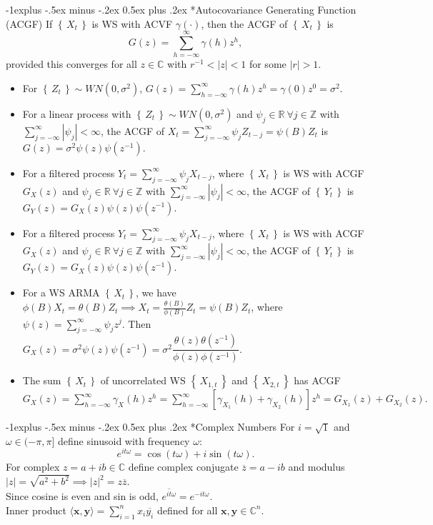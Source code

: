 \documentclass[paper=a4,fontsize=2.89mm]{scrartcl}
\makeatletter
\newcommand{\R}{\mathbb{R}}
\newcommand{\Z}{\mathbb{Z}}
\newcommand{\C}{\mathbb{C}}
\newcommand\abs[1]{\left| #1 \right|}
\newcommand\set[1]{\left\{\, #1 \,\right\}}
\renewcommand{\subsection}{\@startsection{subsection}{2}{0mm}%
                                {-1explus -.5ex minus -.2ex}%
                                {0.5ex plus .2ex}%
                                {\normalfont\normalsize\bfseries}}
\makeatother
\begin{document}
\begin{multicols}{3}
\subsection*{Autocovariance Generating Function (ACGF)}
If $\set{X_t}$ is WS with ACVF $\gamma(\cdot)$, then the ACGF of $\set{X_t}$ is
$$G(z) = \sum_{h=-\infty}^\infty \gamma(h)z^h,$$
provided this converges for all $z\in\C$ with $r^{-1}<\abs{z}<1$ for some $\abs{r}>1$. 
\begin{itemize}
\item
For $\set{Z_t} \sim WN(0,\sigma^2)$, $G(z) = \sum_{h=-\infty}^\infty\gamma(h)z^h = \gamma(0)z^0 = \sigma^2$.

\item
For a linear process with  $\set{Z_t} \sim WN(0,\sigma^2)$ and $\psi_j\in\R~\forall j\in\Z$ with $\sum_{j=-\infty}^\infty\abs{\psi_j}<\infty$,
the ACGF of  $X_t = \sum_{j=-\infty}^\infty \psi_jZ_{t-j} = \psi(B)Z_t$ is $G(z) = \sigma^2\psi(z)\psi(z^{-1}).$ 

\item
For a filtered process $Y_t = \sum_{j=-\infty}^\infty \psi_jX_{t-j}$, where $\set{X_t}$ is WS with ACGF $G_X(z)$ and $\psi_j\in\R~\forall j\in\Z$ with $\sum_{j=-\infty}^\infty\abs{\psi_j}<\infty$, the ACGF of $\set{Y_t}$ is $G_Y(z) = G_X(z)\psi(z)\psi(z^{-1}).$ 

\item
For a filtered process $Y_t = \sum_{j=-\infty}^\infty \psi_jX_{t-j}$, where $\set{X_t}$ is WS with ACGF $G_X(z)$ and $\psi_j\in\R~\forall j\in\Z$ with $\sum_{j=-\infty}^\infty\abs{\psi_j}<\infty$, the ACGF of $\set{Y_t}$ is $G_Y(z) = G_X(z)\psi(z)\psi(z^{-1}).$ 

\item
For a WS ARMA $\set{X_t}$, we have $\phi(B)X_t = \theta(B)Z_t \implies X_t = \frac{\theta(B)}{\phi(B)}Z_t = \psi(B)Z_t$, where
$\psi(z) = \sum_{j=-\infty}^\infty \psi_jz^j$. Then $G_X(z) = \sigma^2\psi(z)\psi(z^{-1}) = \sigma^2\dfrac{\theta(z)\theta(z^{-1})}{\phi(z)\phi(z^{-1})}.$

\item
The sum $\set{X_t}$ of  uncorrelated WS $\set{X_{1,t}}$ and $\set{X_{2,t}}$ has ACGF
$G_X(z) = \sum_{h=-\infty}^\infty \gamma_X(h)z^h = \sum_{h=-\infty}^\infty [\gamma_{X_1}(h) + \gamma_{X_2}(h)]z^h = G_{X_1}(z) + G_{X_2}(z).$
\end{itemize}
\subsection*{Complex Numbers}
For $i = \sqrt{1}$ and $\omega \in (-\pi,\pi]$ define sinusoid with frequency $\omega$:
$$e^{it\omega} = \cos(t\omega) + i \sin(t\omega).$$
For complex $z = a + ib \in \C$ define complex conjugate $\overline{z} = a -ib$ and modulus $\abs{z} = \sqrt{a^2+b^2} \implies \abs{z}^2 = z\overline{z}$.\\
Since cosine is even and sin is odd, $\overline{e^{it\omega}} = e^{-it\omega}$. \\
Inner product $\langle\mathbf{x},\mathbf{y}\rangle = \sum_{i=1}^n x_i\overline{y_i}$ defined for all $\mathbf{x}, \mathbf{y} \in \C^n$.



\end{multicols}
\end{document}

